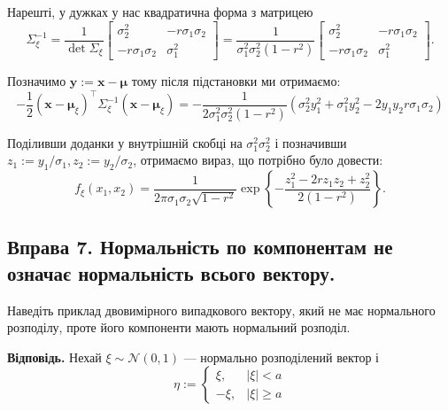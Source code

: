 \documentclass{hw_template}
\begin{document}
Нарешті, у дужках у нас квадратична форма з матрицею
\begin{equation*}
    \Sigma_{\xi}^{-1} = \frac{1}{\det\Sigma_{\xi}}\begin{bmatrix}
        \sigma_2^2 & -r\sigma_1\sigma_2 \\
        -r\sigma_1\sigma_2 & \sigma_1^2
    \end{bmatrix} = \frac{1}{\sigma_1^2\sigma_2^2(1-r^2)}\begin{bmatrix}
        \sigma_2^2 & -r\sigma_1\sigma_2 \\
        -r\sigma_1\sigma_2 & \sigma_1^2
    \end{bmatrix}.
\end{equation*}

Позначимо $\mathbf{y} := \boldsymbol{x} - \boldsymbol{\mu}$ тому після підстановки ми отримаємо:
\begin{equation*}
    -\frac{1}{2}(\boldsymbol{x}-\boldsymbol{\mu}_{\xi})^{\top}\Sigma_{\xi}^{-1}(\boldsymbol{x}-\boldsymbol{\mu}_{\xi}) = -\frac{1}{2\sigma_1^2\sigma_2^2(1-r^2)}(\sigma_2^2y_1^2 + \sigma_1^2y_2^2 - 2y_1y_2r\sigma_1\sigma_2)
\end{equation*}

Поділивши доданки у внутрішній скобці на $\sigma_1^2\sigma_2^2$ і позначивши $z_1 := y_1/\sigma_1,z_2 := y_2/\sigma_2$, отримаємо вираз, що потрібно було довести:
\begin{equation*}
    f_{\xi}(x_1,x_2) = \frac{1}{2\pi\sigma_1\sigma_2\sqrt{1-r^2}}\exp\left\{-\frac{z_1^2 - 2rz_1z_2 + z_2^2}{2(1-r^2)}\right\}.
\end{equation*}

\pagebreak

\subsection{Вправа 7. Нормальність по компонентам не означає нормальність всього вектору.}

\begin{problem}
    Наведіть приклад двовимірного випадкового вектору, який не має нормального розподілу, проте його компоненти мають нормальний розподіл.
\end{problem}

\textbf{Відповідь.} Нехай $\xi \sim \mathcal{N}(0,1)$ --- нормально розподілений вектор і
\begin{equation*}
    \eta := \begin{cases}
        \xi, & |\xi| < a \\
        -\xi, & |\xi| \geq a
    \end{cases}
\end{equation*}
\end{document}
